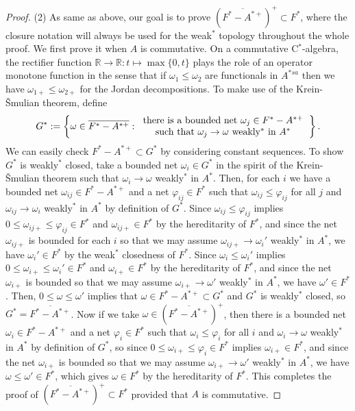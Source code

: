 \documentclass[a4paper]{amsart}
\theoremstyle{plain}
\theoremstyle{definition}
\begin{document}
\begin{proof}
(2)
As same as above, our goal is to prove $(\overline{F^*-A^{*+}})^+\subset F^*$, where the closure notation will always be used for the weak$^*$ topology throughout the whole proof.
We first prove it when $A$ is commutative.
On a commutative C$^*$-algebra, the rectifier function $\mathbb{R}\to\mathbb{R}:t\mapsto\max\{0,t\}$ plays the role of an operator monotone function in the sense that if $\omega_1\le\omega_2$ are functionals in $A^{*sa}$ then we have $\omega_{1+}\le\omega_{2+}$ for the Jordan decompositions.
To make use of the Krein-\v Smulian theorem, define
\[G^*:=\left\{\omega\in\overline{F^*-A^{*+}}:\begin{tabular}{c}there is a bounded net $\omega_j\in F^*-A^{*+}$\\such that $\omega_j\to\omega$ weakly$^*$ in $A^*$\end{tabular}\right\}.\]
We can easily check $F^*-A^{*+}\subset G^*$ by considering constant sequences.
To show $G^*$ is weakly$^*$ closed, take a bounded net $\omega_i\in G^*$ in the spirit of the Krein-\v Smulian theorem such that $\omega_i\to\omega$ weakly$^*$ in $A^*$.
Then, for each $i$ we have a bounded net $\omega_{ij}\in F^*-A^{*+}$ and a net $\varphi_{ij}\in F^*$ such that $\omega_{ij}\le\varphi_{ij}$ for all $j$ and $\omega_{ij}\to\omega_i$ weakly$^*$ in $A^*$ by definition of $G^*$.
Since $\omega_{ij}\le\varphi_{ij}$ implies $0\le\omega_{ij+}\le\varphi_{ij}\in F^*$ and $\omega_{ij+}\in F^*$ by the hereditarity of $F^*$, and since the net $\omega_{ij+}$ is bounded for each $i$ so that we may assume $\omega_{ij+}\to\omega_i'$ weakly$^*$ in $A^*$, we have $\omega_i'\in F^*$ by the weak$^*$ closedness of $F^*$.
Since $\omega_i\le\omega_i'$ implies $0\le\omega_{i+}\le\omega_i'\in F^*$ and $\omega_{i+}\in F^*$ by the hereditarity of $F^*$, and since the net $\omega_{i+}$ is bounded so that we may assume $\omega_{i+}\to\omega'$ weakly$^*$ in $A^*$, we have $\omega'\in F^*$.
Then, $0\le\omega\le\omega'$ implies that $\omega\in F^*-A^{*+}\subset G^*$ and $G^*$ is weakly$^*$ closed, so $G^*=\overline{F^*-A^{*+}}$.
Now if we take $\omega\in(\overline{F^*-A^{*+}})^+$, then there is a bounded net $\omega_i\in F^*-A^{*+}$ and a net $\varphi_i\in F^*$ such that $\omega_i\le\varphi_i$ for all $i$ and $\omega_i\to\omega$ weakly$^*$ in $A^*$ by definition of $G^*$, so since $0\le\omega_{i+}\le\varphi_i\in F^*$ implies $\omega_{i+}\in F^*$, and since the net $\omega_{i+}$ is bounded so that we may assume $\omega_{i+}\to\omega'$ weakly$^*$ in $A^*$, we have $\omega\le\omega'\in F^*$, which gives $\omega\in F^*$ by the hereditarity of $F^*$.
This completes the proof of $(\overline{F^*-A^{*+}})^+\subset F^*$ provided that $A$ is commutative.


\end{proof}
\end{document}
